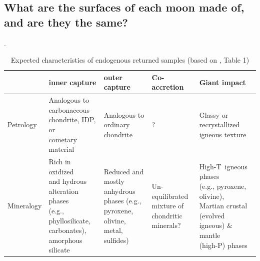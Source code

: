 \subsection{What are the surfaces of each moon made of, and are they the same?}

\begin{table}[hbt!]
	\caption{Expected characteristics of endogenous returned samples (based on \citet{usui_importance_2020}{, Table 1})}.
	\label{table:samples}
	\footnotesize
	\centering %
	\renewcommand{\cellalign}{tl}
	\renewcommand\cellgape{\Gape[5pt]}
	
	\begin{tabular}{|l|l|l|l|l|}
		\hline
		& \textbf{inner capture} & \textbf{outer capture} & \textbf{Co-accretion} & \textbf{Giant impact} \\
		\hline
		
		Petrology & 
		\makecell{Analogous to \\carbonaceous \\chondrite, IDP, or \\cometary material} & 
		\makecell{Analogous to \\ordinary chondrite} & 
		? & 
		\makecell{Glassy or recrystallized \\igneous texture} \\
		
		Mineralogy & 
		\makecell{Rich in oxidized\\ and hydrous \\alteration phases \\(e.g., phyllosilicate, \\carbonates), \\amorphous silicate} & 
		\makecell{Reduced and \\mostly anhydrous \\phases (e.g., \\pyroxene, olivine, \\metal, sulfides)} &
		\makecell{Un-equilibrated \\mixture of \\chondritic \\minerals?} & 
		\makecell{High-T igneous phases \\(e.g., pyroxene, olivine), \\Martian crustal (evolved \\igneous) \& mantle \\(high-P) phases} \\
		

\end{tabular}
\end{table}
